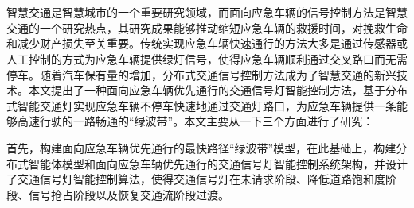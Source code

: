 \vspace{-2.5cm}
\chapter*{}
\vspace{-1cm}

\setlength{\baselineskip}{25pt}
智慧交通是智慧城市的一个重要研究领域，而面向应急车辆的信号控制方法是智慧交通的一个研究热点，其研究成果能够推动缩短应急车辆的救援时间，对挽救生命和减少财产损失至关重要。传统实现应急车辆快速通行的方法大多是通过传感器或人工控制的方式为应急车辆提供绿灯信号，使得应急车辆顺利通过交叉路口而无需停车。随着汽车保有量的增加，分布式交通信号控制方法成为了智慧交通的新兴技术。本文提出了一种面向应急车辆优先通行的交通信号灯智能控制方法，基于分布式智能交通灯实现应急车辆不停车快速地通过交通灯路口，为应急车辆提供一条能够高速行驶的一路畅通的“绿波带”。本文主要从一下三个方面进行了研究：



首先，构建面向应急车辆优先通行的最快路径“绿波带”模型，在此基础上，构建分布式智能体模型和面向应急车辆优先通行的交通信号灯智能控制系统架构，并设计了交通信号灯智能控制算法，使得交通信号灯在未请求阶段、降低道路饱和度阶段、信号抢占阶段以及恢复交通流阶段过渡。

